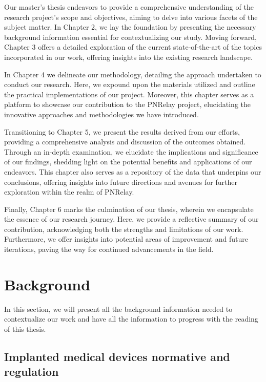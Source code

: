 \documentclass{Configuration_Files/PoliMi3i_thesis}
\begin{document}
Our master's thesis endeavors to provide a comprehensive understanding of the research project's scope and objectives, aiming to delve into various facets of the subject matter. In Chapter 2, we lay the foundation by presenting the necessary background information essential for contextualizing our study. Moving forward, Chapter 3 offers a detailed exploration of the current state-of-the-art of the topics incorporated in our work, offering insights into the existing research landscape.

In Chapter 4 we delineate our methodology, detailing the approach undertaken to conduct our research. Here, we expound upon the materials utilized and outline the practical implementations of our project. Moreover, this chapter serves as a platform to showcase our contribution to the PNRelay project, elucidating the innovative approaches and methodologies we have introduced.

Transitioning to Chapter 5, we present the results derived from our efforts, providing a comprehensive analysis and discussion of the outcomes obtained. Through an in-depth examination, we elucidate the implications and significance of our findings, shedding light on the potential benefits and applications of our endeavors. This chapter also serves as a repository of the data that underpins our conclusions, offering insights into future directions and avenues for further exploration within the realm of PNRelay.

Finally, Chapter 6 marks the culmination of our thesis, wherein we encapsulate the essence of our research journey. Here, we provide a reflective summary of our contribution, acknowledging both the strengths and limitations of our work. Furthermore, we offer insights into potential areas of improvement and future iterations, paving the way for continued advancements in the field.





\chapter{Background}

In this section, we will present all the background information needed to contextualize our work and have all the information to progress with the reading of this thesis.


\section{Implanted medical devices normative and regulation}
\end{document}
